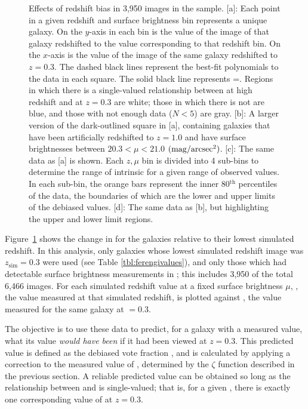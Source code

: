 \documentclass[twocolumn]{aastex6}
\begin{document}
\begin{figure}
\caption{Effects of redshift bias in 3,950 images in the \ferengi{} sample.
[a]: Each point in a given redshift and surface brightness bin represents a
unique galaxy. On the $y$-axis in each bin is the \ffeatures{} value of the
image of that galaxy redshifted to the value corresponding to that redshift
bin. On the $x$-axis is the \ffeatures{} value of the image of the same galaxy
redshifted to $z=0.3$. The dashed black lines represent the best-fit
polynomials to the data in each square. The solid black line represents
\ffeaturesz=\ffeaturesrest. Regions in which there is a single-valued
relationship between \ffeatures{} at high redshift and at $z=0.3$ are white;
those in which there is not are blue, and those with not enough data ($N<5$)
are gray. [b]: A larger version of the dark-outlined square in [a], containing
\ferengi{} galaxies that have been artificially redshifted to $z=1.0$ and have
surface brightnesses between $20.3 < \mu < 21.0$ $\rm (mag/arcsec^2)$. [c]: The
same data as [a] is shown. Each $z,\mu$ bin is divided into 4 sub-bins to
determine the range of intrinsic \ffeaturesrest{} for a given range of observed
\ffeaturesz{} values. In each sub-bin, the orange bars represent the inner
80$^\mathrm{th}$ percentiles of the data, the boundaries of which are the lower
and upper limits of the debiased values. [d]: The same data as [b], but
highlighting the upper and lower limit regions.}
\label{fig:f_vs_f}
\end{figure}

Figure~\ref{fig:f_vs_f} shows the change in \ffeatures{} for the \ferengi{}
galaxies relative to their lowest simulated redshift. In this analysis, only
galaxies whose lowest simulated redshift image was $z_\mathrm{sim}=0.3$ were
used (see Table \ref{tbl:ferengivalues}), and only those which had detectable
surface brightness measurements in \sextractor; this includes 3,950 of the
total 6,466 images. For each simulated redshift value \zsim{} at a fixed
surface brightness $\mu$, \ffeaturesz, the value measured at that simulated
redshift, is plotted against \ffeaturesrest, the value measured for the same
galaxy at \zsim$=0.3$. 
 
The objective is to use these data to predict, for a galaxy with a measured
\ffeaturesz{} value, what its \ffeatures{} value \emph{would have been} if it
had been viewed at $z=0.3$. This predicted value is defined as the debiased
vote fraction \ffeaturesdebiased, and is calculated by applying a correction to
the measured value of \ffeatures, determined by the $\zeta$ function described
in the previous section. A reliable predicted value can be obtained so long as
the relationship between \ffeaturesz{} and \ffeaturesrest{} is single-valued;
that is, for a given \ffeaturesz, there is exactly one corresponding value of
\ffeatures{} at $z=0.3$. 
\end{document}
